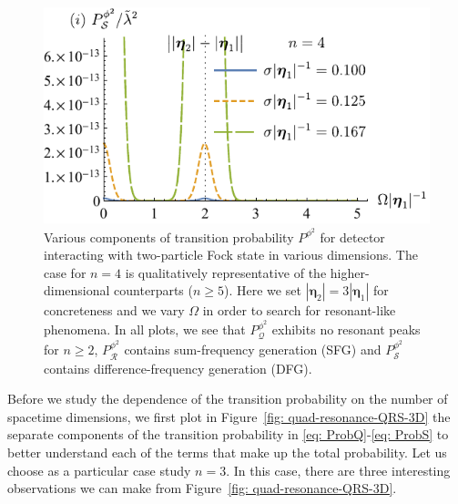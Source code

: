 \documentclass[11pt,prd,onecolumn,superscriptaddress,nofootinbib,floatfix,amsmath,amssymb]{revtex4-2}
\newcommand{\ba}{{\bm{\eta}_1}}
\newcommand{\bb}{{\bm{\eta}_2}}
\begin{document}
\begin{figure}[tp]
        \includegraphics[scale=0.64]{Fig6i.pdf}
        \caption{Various components of transition probability $P^{\phi^2}$ for detector interacting with two-particle Fock state in various dimensions. The case for $n=4$ is qualitatively representative of the higher-dimensional counterparts ($n\geq 5$). Here we set $|\bb|=3|\ba|$ for concreteness and we vary $\Omega$ in order to search for resonant-like phenomena. In all plots, we see that $P^{\phi^2}_\mathcal{Q}$ exhibits no resonant peaks for $n\geq 2$, $P^{\phi^2}_\mathcal{R}$ contains sum-frequency generation (SFG) and $P^{\phi^2}_\mathcal{S}$ contains difference-frequency generation (DFG).}
        \label{fig: quad-resonance-QRS-therest}
    \end{figure}    

    
    Before we study the dependence of the transition probability on the number of spacetime dimensions, we first plot in Figure~\ref{fig: quad-resonance-QRS-3D} the separate components of the transition probability in \eqref{eq: ProbQ}-\eqref{eq: ProbS} to better understand each of the terms that make up the total probability. Let us choose as a particular case study $n=3$. In this case, there are three interesting observations we can make from Figure~\ref{fig: quad-resonance-QRS-3D}. 
    
\end{document}
